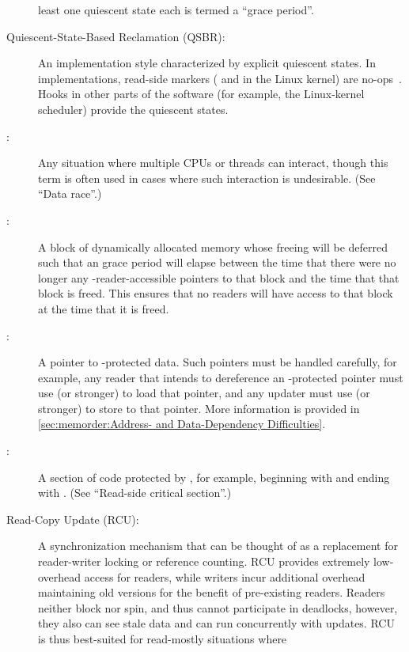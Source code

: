 \begin{description}
	least one quiescent state each is termed a ``grace period''.
\item[Quiescent-State-Based Reclamation (QSBR):]
	An  implementation style characterized by explicit quiescent
	states.
	In  implementations, read-side markers
	( and  in the Linux
	kernel) are no-ops~\cite{McKenney98,Slingwine95}.
	Hooks in other parts of the software (for example, the Linux-kernel
	scheduler) provide the quiescent states.
\item[\IXG{Race Condition}:]
	Any situation where multiple CPUs or threads can interact,
	though this term is often used in cases where such interaction
	is undesirable.
	(See ``Data race''.)
\item[\IXGaltr{RCU-Protected Data}{RCU-protected data}:]
	A block of dynamically allocated memory whose freeing will be
	deferred such that an  grace period will elapse between the
	time that there were no longer any -reader-accessible pointers
	to that block and the time that that block is freed.
	This ensures that no  readers will have access to that block at
	the time that it is freed.
\item[\IXGaltr{RCU-Protected Pointer}{RCU-protected pointer}:]
	A pointer to -protected data.
	Such pointers must be handled carefully, for example, any reader
	that intends to dereference an -protected pointer must
	use  (or stronger) to load that pointer,
	and any updater must use  (or stronger)
	to store to that pointer.
	More information is provided in
	\cref{sec:memorder:Address- and Data-Dependency Difficulties}.
\item[\IXGalthmr{RCU Read-Side Critical Section}{RCU read-side}{critical section}:]
	A section of code protected by , for example, beginning with
	 and ending with .
	(See ``Read-side critical section''.)
\item[Read-Copy Update (RCU):]
	A synchronization mechanism that can be thought of as a replacement
	for reader-writer locking or reference counting.
	RCU provides extremely low-overhead access for readers, while
	writers incur additional overhead maintaining old versions
	for the benefit of pre-existing readers.
	Readers neither block nor spin, and thus cannot participate in
	deadlocks, however, they also can see stale data and can
	run concurrently with updates.
	RCU is thus best-suited for read-mostly situations where

\end{description}
